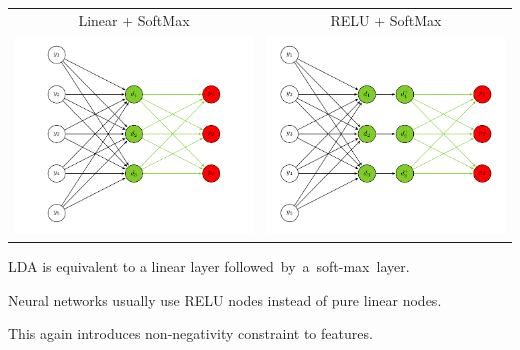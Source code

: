 \documentclass[landscape,footrule]{foils}
\begin{document}
\begin{tabular}{cc}
Linear + SoftMax & RELU + SoftMax\\

\includegraphics[scale=0.8]{linear-softmax-classifer}
&\includegraphics[scale=0.8]{relu-softmax-classifer}\\
\end{tabular}

\begin{triangles}
\item LDA is equivalent to a linear layer \mbox{followed~by~a~soft-max~layer.}
\item Neural networks usually use RELU nodes instead of pure linear nodes.   
\item This again introduces non-negativity constraint to features. 
\end{triangles}
\end{document}
